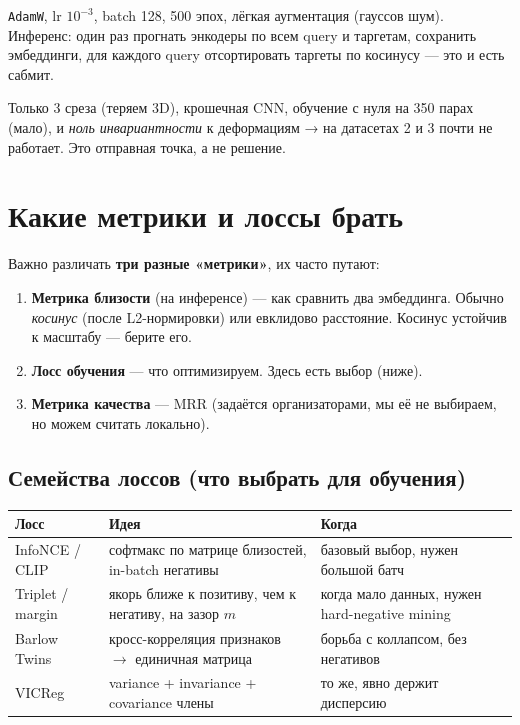 \documentclass[11pt,a4paper]{article}
\begin{document}
\begin{system}
\texttt{AdamW}, lr $10^{-3}$, batch 128, 500 эпох, лёгкая аугментация (гауссов шум).
Инференс: один раз прогнать энкодеры по всем query и таргетам, сохранить эмбеддинги,
для каждого query отсортировать таргеты по косинусу — это и есть сабмит.
\end{system}

\begin{failure}
Только 3 среза (теряем 3D), крошечная CNN, обучение с нуля на 350 парах (мало), и
\emph{ноль инвариантности} к деформациям → на датасетах 2 и 3 почти не работает.
Это отправная точка, а не решение.
\end{failure}

\section{Какие метрики и лоссы брать}

Важно различать \textbf{три разные «метрики»}, их часто путают:

\begin{enumerate}
\item \textbf{Метрика близости} (на инференсе) — как сравнить два эмбеддинга. Обычно
\emph{косинус} (после L2-нормировки) или евклидово расстояние. Косинус устойчив к масштабу — берите его.
\item \textbf{Лосс обучения} — что оптимизируем. Здесь есть выбор (ниже).
\item \textbf{Метрика качества} — MRR (задаётся организаторами, мы её не выбираем, но можем
считать локально).
\end{enumerate}

\subsection{Семейства лоссов (что выбрать для обучения)}

\begin{center}\small
\begin{tabularx}{\linewidth}{@{}l X l@{}}\toprule
\textbf{Лосс} & \textbf{Идея} & \textbf{Когда}\\\midrule
InfoNCE / CLIP & софтмакс по матрице близостей, in-batch негативы & базовый выбор, нужен большой батч\\
Triplet / margin & якорь ближе к позитиву, чем к негативу, на зазор $m$ & когда мало данных, нужен hard-negative mining\\
Barlow Twins & кросс-корреляция признаков $\to$ единичная матрица & борьба с коллапсом, без негативов\\
VICReg & variance + invariance + covariance члены & то же, явно держит дисперсию\\
\bottomrule\end{tabularx}\end{center}
\end{document}
